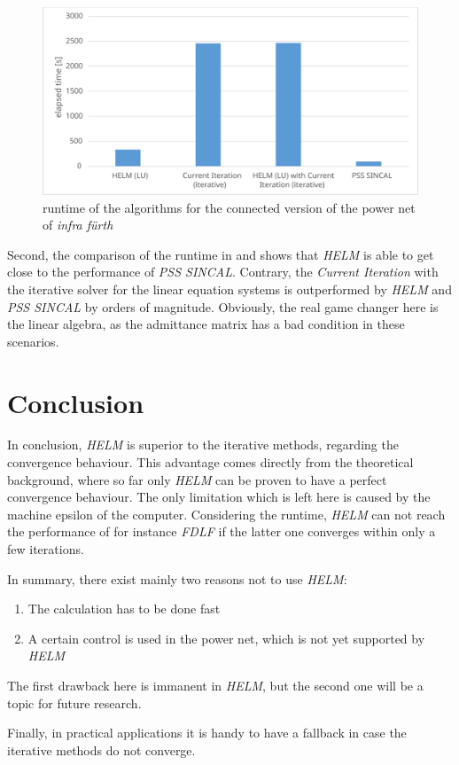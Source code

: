 \begin{figure}
	\centering
	\includegraphics[scale=0.7]{figures/big_net_combined_runtime}
	\caption[Comparison, \emph{infra fürth}, connected, runtime]{runtime of the algorithms for the connected version of the power net of \emph{infra fürth}}
	\label{fig:big_net_combined_runtime}
\end{figure}

Second, the comparison of the runtime in  and  shows that \emph{HELM} is able to get close to the performance of \emph{PSS SINCAL}. Contrary, the \emph{Current Iteration} with the iterative solver for the linear equation systems is outperformed by \emph{HELM} and \emph{PSS SINCAL} by orders of magnitude. Obviously, the real game changer here is the linear algebra, as the admittance matrix has a bad condition in these scenarios.

\section{Conclusion}
In conclusion, \emph{HELM} is superior to the iterative methods, regarding the convergence behaviour. This advantage comes directly from the theoretical background, where so far only \emph{HELM} can be proven to have a perfect convergence behaviour. The only limitation which is left here is caused by the machine epsilon of the computer. Considering the runtime, \emph{HELM} can not reach the performance of for instance \emph{FDLF} if the latter one converges within only a few iterations.

In summary, there exist mainly two reasons not to use \emph{HELM}:
\begin{enumerate}
	\item The calculation has to be done fast
	\item A certain control is used in the power net, which is not yet supported by \emph{HELM}
\end{enumerate}
The first drawback here is immanent in \emph{HELM}, but the second one will be a topic for future research.

Finally, in practical applications it is handy to have a fallback in case the iterative methods do not converge.